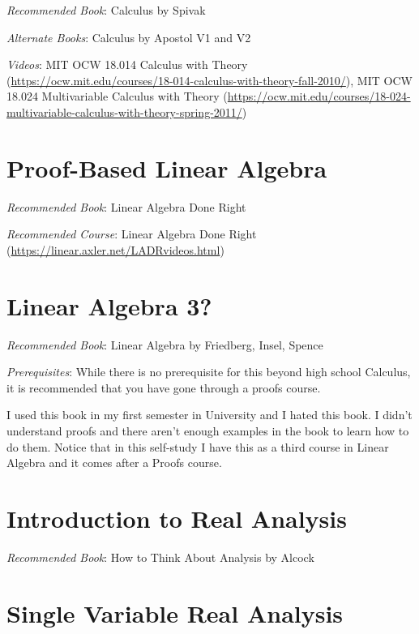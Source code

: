 \documentclass[openany,10pt]{book}
\begin{document}
\textit{Recommended Book}: Calculus by Spivak\newline

\noindent \textit{Alternate Books}: Calculus by Apostol V1 and V2\newline

\noindent \textit{Videos}: MIT OCW 18.014 Calculus with Theory (\url{https://ocw.mit.edu/courses/18-014-calculus-with-theory-fall-2010/}), MIT OCW 18.024 Multivariable Calculus with Theory (\url{https://ocw.mit.edu/courses/18-024-multivariable-calculus-with-theory-spring-2011/})

\chapter{Proof-Based Linear Algebra}

\textit{Recommended Book}: Linear Algebra Done Right \newline

\noindent \textit{Recommended Course}: Linear Algebra Done Right (\url{https://linear.axler.net/LADRvideos.html}) \newline

\chapter{Linear Algebra 3?}

\textit{Recommended Book}: Linear Algebra by Friedberg, Insel, Spence\newline

\noindent \textit{Prerequisites}: While there is no prerequisite for this beyond high school Calculus, it is recommended that you have gone through a proofs course.\newline

\noindent I used this book in my first semester in University and I hated this book.  I didn't understand proofs and there aren't enough examples in the book to learn how to do them.  Notice that in this self-study I have this as a third course in Linear Algebra and it comes after a Proofs course. 


\chapter{Introduction to Real Analysis}

\textit{Recommended Book}: How to Think About Analysis by Alcock\newline


\chapter{Single Variable Real Analysis}
\end{document}
